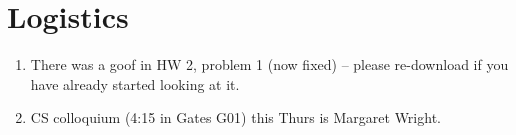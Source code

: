 \section{Logistics}

\begin{enumerate}
\item There was a goof in HW 2, problem 1 (now fixed) -- please re-download
  if you have already started looking at it.
\item CS colloquium (4:15 in Gates G01) this Thurs is Margaret Wright.
\end{enumerate}
